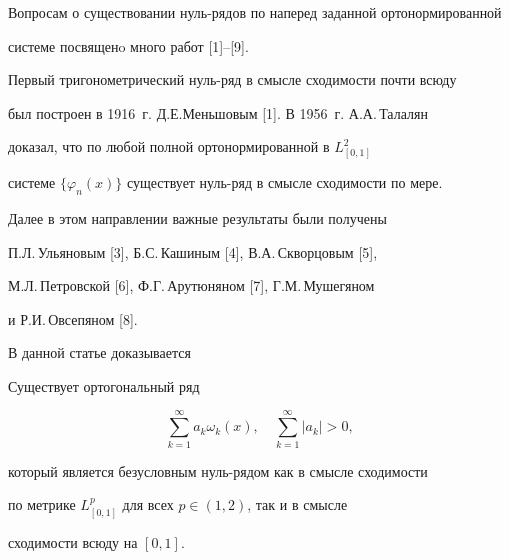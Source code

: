 Вопросам о существовании нуль-рядов по наперед заданной ортонормированной 


системе посвященo много работ [1]--[9]. 





Первый тригонометрический нуль-ряд в смысле сходимости почти всюду 


был построен в 1916~г. Д.Е.Меньшовым [1]. В 1956~г. А.А.\,Талалян 


доказал, что по любой полной ортонормированной в $L^2_{[0,1]}$ 


системе $\{ \varphi_n(x)\}$ существует нуль-ряд в смысле сходимости по мере.





Далее в этом направлении важные результаты были получены 


П.Л.\,Ульяновым [3], Б.С.\,Ка\-ши\-ным [4], В.А.\,Скворцовым [5], 


М.Л.\,Петровской [6], Ф.Г.\,Арутюняном [7], Г.М.\,Мушегяном 


и Р.И.\,Ов\-се\-пя\-ном [8].





В данной статье доказывается





\begin{thm}


Существует ортогональный ряд


$$


\sum_{k=1}^\infty a_k \omega_k(x),\quad \sum_{k=1}^\infty |a_k|>0,


$$


который является безусловным нуль-рядом как в смысле сходимости 


по метрике $L^p_{[0,1]}$ для всех $p\in (1,2)$, так и в смысле 


сходимости всюду на $[0,1]$. 


\end{thm}


 


